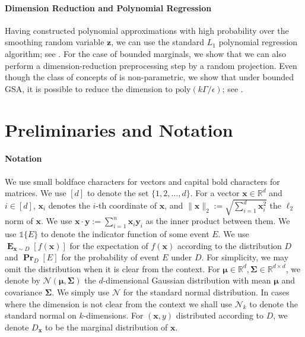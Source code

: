 \documentclass[10pt,a4paper]{article}
\renewcommand\vec[1]{\mathbf{#1}}
\DeclareMathOperator*{\pr}{\mathbf{Pr}}
\DeclareMathOperator*{\E}{\mathbf{E}}
\newcommand{\normal}{\mathcal{N}}
\newcommand{\R}{\mathbb{R}}
\newcommand{\1}{\Ind}
\begin{document}
\paragraph{Dimension Reduction and Polynomial Regression}

Having constructed polynomial approximations with high probability over the smoothing random variable $\mathbf{z}$, we can use the standard $L_1$ polynomial regression algorithm; see \cite{KKMS:05,KOS:08}. For the case of bounded marginals, we show that we can also perform a dimension-reduction preprocessing step by a random projection. Even though the class of concepts of  is non-parametric, we show that under bounded GSA, it is possible to reduce the dimension to $\text{poly}(k \Gamma/\epsilon)$; see . 

\section{Preliminaries and Notation}
\paragraph{Notation}
We use small boldface characters for vectors and capital bold characters for matrices.
We use $[d]$ to denote the set $\{1, 2, \ldots, d\}$.
For a vector $\vec x \in \R^d$ and $i \in [d]$, $\vec x_i$ denotes the $i$-th coordinate of $\vec x$, and $\|\vec x\|_2 := \sqrt{ \sum_{i=1}^d \vec x_i^2 }$ the $\ell_2$ norm of $\vec x$.
We use $\vec x \cdot \vec y := \sum_{i=1}^n \vec x_i  \vec y_i$ as the inner product between them. We use $\mathds 1\{ E  \}$  to denote the indicator function of some event $E$.  We use $\E_{\vec x \sim D}[f(\vec x)]$ for the expectation of $f(\vec x)$ according to the distribution $D$ and $\pr_D[E]$ for the probability of event $E$ under $D$. For simplicity, we may omit the distribution when it is clear from the context. %
For $\vec \mu \in \R^d, \vec \Sigma \in \R^{d \times d}$, we denote by $\normal (\vec \mu, \vec \Sigma)$  the $d$-dimensional Gaussian distribution
with mean $\vec \mu$ and covariance $\vec \Sigma$.  We simply use $\mathcal N$
for the standard normal distribution.  In cases where the dimension is not clear from the context we shall use $\mathcal{N}_k$ to denote the standard normal on $k$-dimensions.
For $(\vec x, y)$ distributed according to $D$, we denote $D_{\vec x}$
to be the marginal distribution of $\vec x$.
\end{document}
